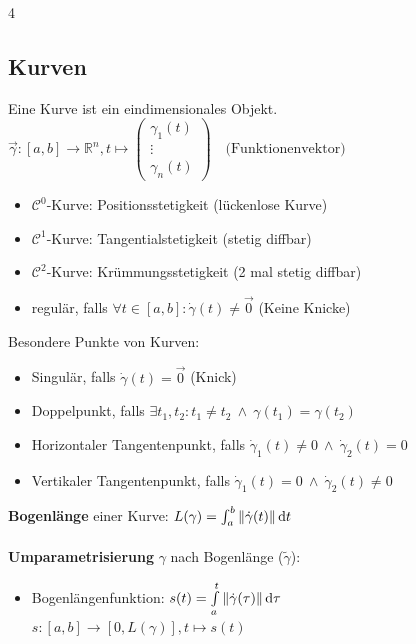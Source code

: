 \documentclass[6pt,a4paper]{scrartcl}
\newcommand{\norm}[2][\relax]{\ifx#1\relax \ensuremath{\left\Vert#2\right\Vert}\else \ensuremath{\left\Vert#2\right\Vert_{#1}}\fi}
\newcommand{\ra}[0]{\ensuremath{\rightarrow}}
\begin{document}
\begin{multicols*}{4}
    \subsection{Kurven}
    Eine Kurve ist ein eindimensionales Objekt.\\
    $ \vec \gamma:[a,b] \rightarrow \mathbb R^n, t \mapsto \begin{pmatrix} \gamma_1(t) \\ \vdots \\ \gamma_n(t) \end{pmatrix} \quad \text{(Funktionenvektor)} $
    \begin{itemize}\itemsep-2pt
        \item $\mathcal C^0$-Kurve: Positionsstetigkeit (lückenlose Kurve)
        \item $\mathcal C^1$-Kurve: Tangentialstetigkeit (stetig diffbar)
        \item $\mathcal C^2$-Kurve: Krümmungsstetigkeit (2 mal stetig diffbar)
        \item regulär, falls $\forall t \in [a,b]:\dot \gamma(t) \ne \vec 0$ (Keine Knicke)
    \end{itemize}
    Besondere Punkte von Kurven:
    \begin{itemize}\itemsep-2pt
        \item Singulär, falls $\dot \gamma(t)=\vec 0$ (Knick)
        \item Doppelpunkt, falls $\exists t_1,t_2:t_1 \ne t_2 \ \land \ \gamma(t_1)=\gamma(t_2)$
        \item Horizontaler Tangentenpunkt, falls $\dot \gamma_1(t) \ne 0 \ \land \ \dot \gamma_2(t)=0$
        \item Vertikaler Tangentenpunkt, falls $\dot \gamma_1(t) = 0 \ \land \ \dot \gamma_2(t) \ne 0$
    \end{itemize}
    \textbf{Bogenlänge} einer Kurve: $L(\gamma) = \int_{a}^{b} \norm{\dot \gamma(t)} \mathrm dt$ \\ \\
    \textbf{Umparametrisierung} $\gamma$ nach Bogenlänge ($\tilde \gamma$):
    \begin{itemize} \itemsep0pt
        \item Bogenlängenfunktion: $s(t) = \int\limits_a^t \norm{\dot \gamma(\tau)} \mathrm d\tau$\\
              $s: [a,b] \ra [0,L(\gamma)], t \mapsto s(t)$

\end{itemize}
\end{multicols*}
\end{document}
